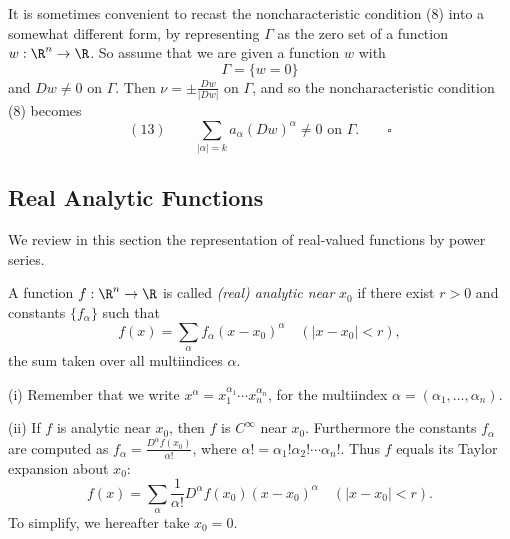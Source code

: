 \begin{remark}
\label{rem:noncharacteristic-condition-level-set}
It is sometimes convenient to recast the noncharacteristic condition (8) into a somewhat different form, by representing $\Gamma$ as the zero set of a function $w : \R^n \to \R$. So assume that we are given a function $w$ with
$$\Gamma = \{w = 0\}$$
and $Dw \neq 0$ on $\Gamma$. Then $\nu = \pm \frac{Dw}{|Dw|}$ on $\Gamma$, and so the noncharacteristic condition (8) becomes
$$(13) \qquad \sum_{|\alpha|=k} a_\alpha(Dw)^\alpha \neq 0 \text{ on } \Gamma. \qquad \square$$
\end{remark}

\subsection{Real Analytic Functions}
\label{sec:real-analytic-functions}

We review in this section the representation of real-valued functions by power series.

\begin{definition}
\label{def:real-analytic-function}
A function $f : \R^n \to \R$ is called \textit{(real) analytic near} $x_0$ if there exist $r > 0$ and constants $\{f_\alpha\}$ such that
$$f(x) = \sum_{\alpha} f_\alpha(x - x_0)^\alpha \quad (|x - x_0| < r),$$
the sum taken over all multiindices $\alpha$.
\end{definition}

\begin{remark}
\label{rem:real-analytic-function-remarks}
(i) Remember that we write $x^\alpha = x_1^{\alpha_1} \cdots x_n^{\alpha_n}$, for the multiindex $\alpha = (\alpha_1, \ldots, \alpha_n)$.

(ii) If $f$ is analytic near $x_0$, then $f$ is $C^\infty$ near $x_0$. Furthermore the constants $f_\alpha$ are computed as $f_\alpha = \frac{D^\alpha f(x_0)}{\alpha!}$, where $\alpha! = \alpha_1 !\alpha_2! \cdots \alpha_n!$. Thus $f$ equals its Taylor expansion about $x_0$:
$$f(x) = \sum_\alpha \frac{1}{\alpha!} D^\alpha f(x_0)(x - x_0)^\alpha \quad (|x - x_0| < r).$$
To simplify, we hereafter take $x_0 = 0$.
\end{remark}

